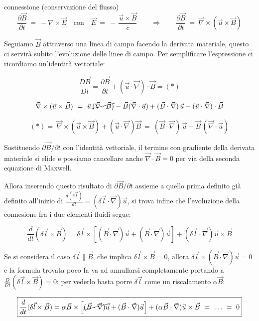 \begin{teorema}{ connessione (conservazione del flusso)}{}
	\[ \frac{\partial\vec B}{\partial t}\ =\ -\nabla \times \vec E
	\quad \text{con} \quad 
	\vec E\ =\ -\,\frac{\vec u \times \vec B}{c} 
	\quad \quad 
	\Rightarrow\qquad \frac{\partial\vec B}{\partial t}\ =\ \vec \nabla\times(\vec u\times\vec B)\]
	
	Seguiamo $\vec B$ attraverso una linea di campo facendo la derivata materiale, questo ci servirà subito l'evoluzione delle linee di campo. Per semplificare l'espressione ci ricordiamo un'identità vettoriale:
	
	\[\frac{D\vec B}{Dt}=\frac{\partial\vec B}{\partial t}+(\vec u\cdot \vec \nabla)\cdot \vec B=(*)\]
	
	\[\vec \nabla\times(\vec u\times\vec B)\ =\ \vec u\,\cancel{( \vec \nabla \cdot \vec B)}-\vec B( \vec \nabla \cdot\vec u) + (\vec B \cdot \vec\nabla)\,\vec u-(\vec u\cdot\vec \nabla)\cdot \vec B\]
	
	\[(*)=\ \vec \nabla\times(\vec u\times\vec B) + (\vec u\cdot \vec \nabla) \vec B\ =\ (\vec B\cdot \vec \nabla)\, \vec u - \vec B\, (\vec \nabla\cdot \vec u)\] 
	
	Sostituendo $\partial\vec B/\partial t$ con l'identità vettoriale, il termine con gradiente della derivata materiale si elide e possiamo cancellare anche  $\vec \nabla\cdot \vec B=0$ per via della seconda equazione di Maxwell.
	
	Allora inserendo questo risultato di $\partial\vec B/\partial t$ assieme a quello prima definito già definito all'inizio di $\frac{d(\delta\vec l)}{dt}=(\delta \vec l\cdot\vec \nabla)\vec u$, si trova infine che l'evoluzione della connesione fra i due elementi fluidi segue: 
	
	\[\frac{d}{dt}(\delta\vec l\times\vec B)=\delta\vec l\times \left[(\vec B\cdot\vec \nabla )\vec u+(\vec B\cdot\vec \nabla )\vec u\right]  +(\delta\vec l\cdot\vec\nabla)\vec u\times\vec B\] 
	
	\vspace{0.5cm}
	
	Se si considera il caso $\delta \vec l\parallel\vec B$, che implica $\delta \vec l\times \vec B = 0$, allora  $\delta\vec l\times(\vec B\cdot\vec \nabla) \vec u=0$ e la formula trovata poco fa va ad annullarsi completamente portando a $\frac{D}{Dt}(\delta \vec l \times \vec B)=0$: per vederlo basta porre $\delta\vec l$ come un riscalamento $\alpha \vec B$:
	
	
	\[\boxed{\frac{d}{dt}(\delta\vec l\times\vec B)=\alpha\vec B\times \left[\cancel{(\vec B\cdot\vec \nabla )\vec u}+(\vec B\cdot\vec \nabla )\vec u\right]  +(\alpha \vec B \cdot\vec\nabla)\vec u\times\vec B \ =\ \dots\ =\ 0}\] 
	

\end{teorema}
